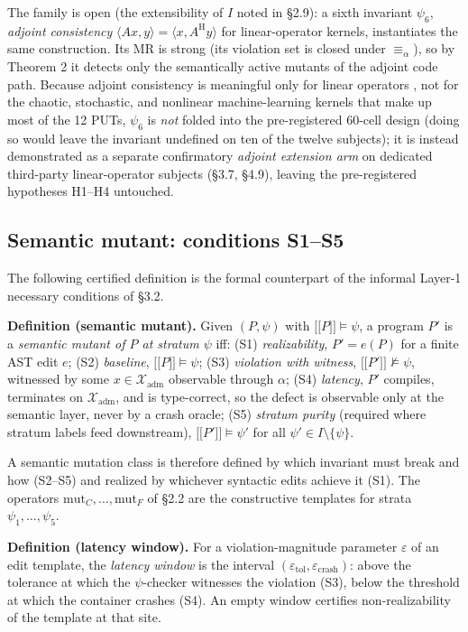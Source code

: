 \documentclass[acmsmall,screen,review]{acmart}
\providecommand{\llbracket}{\mathopen{\lbrack\!\lbrack}}
\providecommand{\rrbracket}{\mathclose{\rbrack\!\rbrack}}
\begin{document}
The family is open (the extensibility of $I$ noted in §2.9): a sixth
invariant $\psi_6$, \emph{adjoint consistency}
$\langle A x, y\rangle = \langle x, A^{\mathrm{H}} y\rangle$ for
linear-operator kernels, instantiates the same construction. Its MR is
strong (its violation set is closed under $\equiv_\alpha$), so by Theorem
2 it detects only the semantically active mutants of the adjoint code
path. Because adjoint consistency is meaningful only for linear operators
, not for the chaotic, stochastic, and nonlinear machine-learning
kernels that make up most of the 12 PUTs, $\psi_6$ is \emph{not} folded
into the pre-registered 60-cell design (doing so would leave the invariant
undefined on ten of the twelve subjects); it is instead demonstrated as a
separate confirmatory \emph{adjoint extension arm} on dedicated
third-party linear-operator subjects (§3.7, §4.9), leaving the
pre-registered hypotheses H1--H4 untouched.

\subsection{Semantic mutant: conditions S1--S5}\label{theory-s1s5}

The following certified definition is the formal counterpart of the
informal Layer-1 necessary conditions of §3.2.

\textbf{Definition (semantic mutant).} Given $(P, \psi)$ with
$\llbracket P \rrbracket \models \psi$, a program $P'$ is a
\emph{semantic mutant of $P$ at stratum $\psi$} iff: (S1)
\emph{realizability}, $P' = e(P)$ for a finite AST edit $e$; (S2)
\emph{baseline}, $\llbracket P \rrbracket \models \psi$; (S3)
\emph{violation with witness},
$\llbracket P' \rrbracket \not\models \psi$, witnessed by some
$x \in \mathcal{X}_{\mathrm{adm}}$ observable through $\alpha$; (S4)
\emph{latency}, $P'$ compiles, terminates on $\mathcal{X}_{\mathrm{adm}}$,
and is type-correct, so the defect is observable only at the semantic
layer, never by a crash oracle; (S5) \emph{stratum purity} (required
where stratum labels feed downstream),
$\llbracket P' \rrbracket \models \psi'$ for all
$\psi' \in I \setminus \{\psi\}$.

A semantic mutation class is therefore defined by which invariant must
break and how (S2--S5) and realized by whichever syntactic edits achieve
it (S1). The operators $\mathrm{mut}_C, \dots, \mathrm{mut}_F$ of §2.2
are the constructive templates for strata $\psi_1, \dots, \psi_5$.

\textbf{Definition (latency window).} For a violation-magnitude
parameter $\varepsilon$ of an edit template, the \emph{latency window}
is the interval $(\varepsilon_{\mathrm{tol}}, \varepsilon_{\mathrm{crash}})$:
above the tolerance at which the $\psi$-checker witnesses the violation
(S3), below the threshold at which the container crashes (S4). An empty
window certifies non-realizability of the template at that site.
\end{document}
